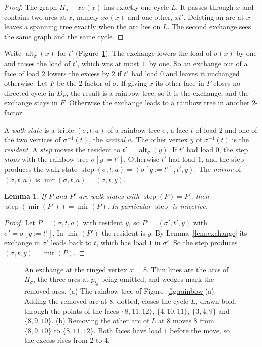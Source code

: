 \documentclass[10pt]{amsart}
\numberwithin{equation}{section}
\newtheorem{lemma}[equation]{Lemma}
\theoremstyle{definition}
\theoremstyle{remark}
\newcommand{\alt}{\operatorname{alt}}
\newcommand{\step}{\operatorname{step}}
\newcommand{\mirror}{\operatorname{mir}}
\begin{document}
\begin{proof}
The graph $H_\sigma+x\sigma(x)$ has exactly one cycle $L$.
It passes through $x$ and contains two arcs at $x$, namely $x\sigma(x)$ and one other, $xt'$.
Deleting an arc at $x$ leaves a spanning tree exactly when the arc lies on $L$.
The second exchange sees the same graph and the same cycle.
\end{proof}

Write $\alt_\sigma(x)$ for $t'$ (Figure~\ref{fig:exchange}).
The exchange lowers the load of $\sigma(x)$ by one and raises the load of $t'$, which was at most $1$, by one.
So an exchange out of a face of load $2$ lowers the excess by $2$ if $t'$ had load $0$ and leaves it unchanged otherwise.
Let $F$ be the $2$-factor of $\sigma$.
If giving $x$ its other face in $F$ closes no directed cycle in $D_F$, the result is a rainbow tree, so it is the exchange, and the exchange stays in $F$.
Otherwise the exchange leads to a rainbow tree in another $2$-factor.

A \emph{walk state} is a triple $(\sigma,t,a)$ of a rainbow tree $\sigma$, a face $t$ of load $2$ and one of the two vertices of $\sigma^{-1}(t)$, the \emph{arrival} $a$.
The other vertex $y$ of $\sigma^{-1}(t)$ is the \emph{resident}.
A \emph{step} moves the resident to $t'=\alt_\sigma(y)$.
If $t'$ had load $0$, the step \emph{stops} with the rainbow tree $\sigma[y:=t']$.
Otherwise $t'$ had load $1$, and the step produces the walk state $\step(\sigma,t,a)=(\sigma[y:=t'],t',y)$.
The \emph{mirror} of $(\sigma,t,a)$ is $\mirror(\sigma,t,a)=(\sigma,t,y)$.

\begin{lemma}\label{lem:reverse}
If $P$ and $P'$ are walk states with $\step(P)=P'$, then $\step(\mirror(P'))=\mirror(P)$.
In particular $\step$ is injective.
\end{lemma}

\begin{proof}
Let $P=(\sigma,t,a)$ with resident $y$, so $P'=(\sigma',t',y)$ with $\sigma'=\sigma[y:=t']$.
In $\mirror(P')$ the resident is $y$.
By Lemma~\ref{lem:exchange} its exchange in $\sigma'$ leads back to $t$, which has load $1$ in $\sigma'$.
So the step produces $(\sigma,t,y)=\mirror(P)$.
\end{proof}

\begin{figure}[H]
\centering
\scalebox{.9}{\begin{minipage}{\textwidth}\centering\end{minipage}}
\caption{An exchange at the ringed vertex $x=8$. Thin lines are the arcs of $H_\sigma$, the three arcs at $p_{t_0}$ being omitted, and wedges mark the removed arcs. (a) The rainbow tree of Figure~\ref{fig:rainbow}(a). Adding the removed arc at $8$, dotted, closes the cycle $L$, drawn bold, through the points of the faces $\{8,11,12\}$, $\{4,10,11\}$, $\{3,4,9\}$ and $\{8,9,10\}$. (b) Removing the other arc of $L$ at $8$ moves $8$ from $\{8,9,10\}$ to $\{8,11,12\}$. Both faces have load $1$ before the move, so the excess rises from $2$ to $4$.}
\label{fig:exchange}
\end{figure}
\end{document}
